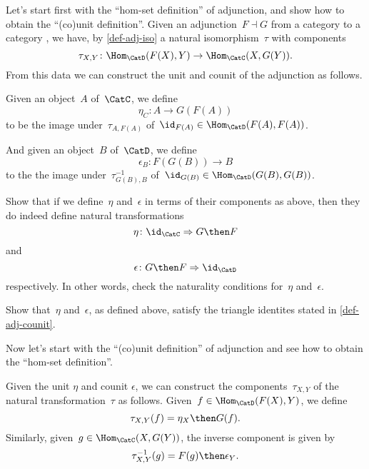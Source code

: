 Let's start first with the ``hom-set definition'' of adjunction, and show how to obtain the ``(co)unit definition''. 
Given an adjunction~$F \dashv G$ from a category \CatC to a category \CatD, we have, by \cref{def-adj-iso} a natural isomorphism~$\tau$ with components
\begin{equation*}
\tau_{X,Y} \colon \Hom_{\CatD}(F(X) ,Y ) \to \Hom_{\CatC}(X , G(Y) ).
\end{equation*}
From this data we can construct the unit and counit of the adjunction as follows. 

Given an object~$A$ of~$\CatC$, we define 
\begin{equation*}
\eta_C \colon A \to G(F(A)) 
\end{equation*}
to be the image under~$\tau_{A, F(A)}$ of~$\id_{F(A)} \in \Hom_{\CatD}(F (A) , F(A) )$. 

And given an object~$B$ of~$\CatD$, we define 
\begin{equation*}
\epsilon_B \colon F(G(B)) \to B
\end{equation*}
to the the image under~$\tau_{G(B), B}^{-1}$ of~$\id_{G(B)} \in \Hom_{\CatD}(G(B), G(B))$. 

\begin{exercise}
Show that if we define~$\eta$ and~$\epsilon$ in terms of their components as above, then they do indeed define natural transformations 
\begin{equation*}
\eta\colon \id_{\CatC} \Rightarrow G\then F
\end{equation*}
and
\begin{equation*}
\epsilon\colon G \then F \Rightarrow \id_{\CatD}
\end{equation*}
respectively. In other words, check the naturality conditions for~$\eta$ and~$\epsilon$. 
\end{exercise}

\begin{exercise}
Show that~$\eta$ and~$\epsilon$, as defined above, satisfy the triangle identites stated in \cref{def-adj-counit}.
 \end{exercise}

Now let's start with the ``(co)unit definition'' of adjunction and see how to obtain the ``hom-set definition''. 

Given the unit $\eta$ and counit $\epsilon$, we can construct the components~$\tau_{X,Y}$ of the natural transformation~$\tau$ as follows. Given~$f \in \Hom_{\CatD}(F(X),Y)$, we define
\begin{equation*}
\tau_{X,Y}(f) = \eta_X \then G(f).
\end{equation*}
Similarly, given~$g \in \Hom_{\CatC}(X,G(Y))$, the inverse component is given by 
\begin{equation*}
\tau_{X,Y}^{-1}(g) = F(g) \then \epsilon_Y. 
\end{equation*}

